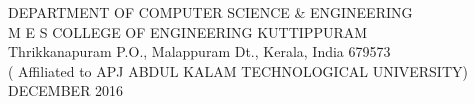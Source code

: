 \begin{titlepage}
			\begin{center}
				\begin{singlespace}
						DEPARTMENT OF COMPUTER SCIENCE \& ENGINEERING\\[4pt]
						 M E S COLLEGE OF ENGINEERING KUTTIPPURAM \\[2pt]
						 Thrikkanapuram  P.O., Malappuram Dt., Kerala, India 679573 \\[6pt]
                        ( Affiliated to APJ ABDUL KALAM TECHNOLOGICAL UNIVERSITY)\\[6pt]
						\vspace{12pt}
						 DECEMBER 2016
				\end{singlespace}
			\end{center}
	\vspace{-.5cm}
\setcounter{page}{0}
\pagebreak
\end{titlepage}
